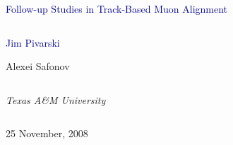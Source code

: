 \documentclass[compress]{beamer}
\begin{document}
\begin{frame}
\vfill
\begin{center}
\textcolor{darkblue}{\Large Follow-up Studies in Track-Based Muon Alignment}

\vfill
\begin{columns}
\begin{center}
\large
\textcolor{darkblue}{Jim Pivarski}

\vspace{0.2 cm}
Alexei Safonov
\end{center}
\end{columns}

\begin{columns}
\begin{center}
\scriptsize
{\it Texas A\&M University}
\end{center}
\end{columns}

\vfill
25 November, 2008

\end{center}
\end{frame}


\small
\end{document}
